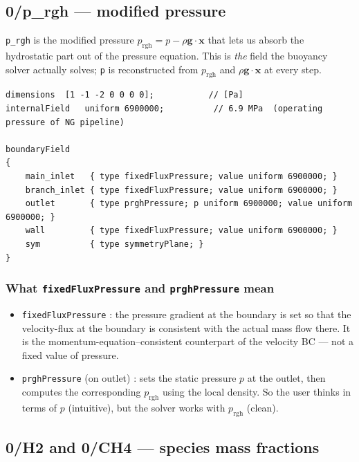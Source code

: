 \documentclass[11pt,a4paper]{article}
\begin{document}
\subsection{0/p\_rgh --- modified pressure}

\texttt{p\_rgh} is the modified pressure
$p_\mathrm{rgh} = p - \rho \mathbf{g}\!\cdot\!\mathbf{x}$ that lets us
absorb the hydrostatic part out of the pressure equation. This is
\emph{the} field the buoyancy solver actually solves; \texttt{p} is
reconstructed from $p_\mathrm{rgh}$ and $\rho \mathbf{g}\!\cdot\!\mathbf{x}$
at every step.

\begin{lstlisting}[style=foamstyle,caption={\texttt{0/p\_rgh} (full)}]
dimensions  [1 -1 -2 0 0 0 0];           // [Pa]
internalField   uniform 6900000;          // 6.9 MPa  (operating pressure of NG pipeline)

boundaryField
{
    main_inlet   { type fixedFluxPressure; value uniform 6900000; }
    branch_inlet { type fixedFluxPressure; value uniform 6900000; }
    outlet       { type prghPressure; p uniform 6900000; value uniform 6900000; }
    wall         { type fixedFluxPressure; value uniform 6900000; }
    sym          { type symmetryPlane; }
}
\end{lstlisting}

\subsubsection{What \texttt{fixedFluxPressure} and \texttt{prghPressure} mean}

\begin{itemize}[leftmargin=1.5em,topsep=2pt]
    \item \texttt{fixedFluxPressure} : the pressure gradient at the
    boundary is set so that the velocity-flux at the boundary is
    consistent with the actual mass flow there. It is the
    momentum-equation--consistent counterpart of the velocity BC ---
    not a fixed value of pressure.
    \item \texttt{prghPressure} (on outlet) : sets the static pressure
    \(p\) at the outlet, then computes the corresponding
    \(p_\mathrm{rgh}\) using the local density. So the user thinks
    in terms of \(p\) (intuitive), but the solver works with
    \(p_\mathrm{rgh}\) (clean).
\end{itemize}

\subsection{0/H2 and 0/CH4 --- species mass fractions}
\end{document}
